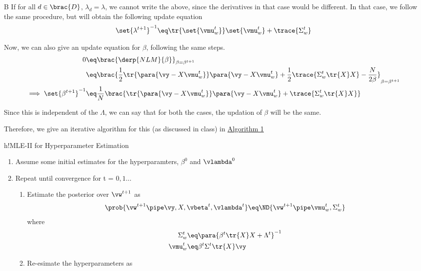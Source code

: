 \documentclass{article}
\begin{document}
\begin{question}
\begin{qpart}{B}
		If for all $d \in \brac{D}$, $\lambda_d = \lambda$, we cannot write the above, since the derivatives in that case would be different.
		In that case, we follow the same procedure, but will obtain the following update equation
		\begin{align*}
			\set{\lambda^{t + 1}}^{-1}	\eq	\tr{\set{\vmu_w^t}} \set{\vmu_w^t} + \trace{\Sigma_w^t}
		\end{align*}

		Now, we can also give an update equation for $\beta$, following the same steps.
		\begin{align*}
			0	&\eq	\brac{\derp{NLM}{\beta}}_{\beta = \beta^{t + 1}} \\
			&\eq	\brac{\frac{1}{2} \tr{\para{\vy - X \vmu_w^t}} \para{\vy - X \vmu_w^t} + \frac{1}{2} \trace{\Sigma_w^t \tr{X} X} - \frac{N}{2 \beta}}_{\beta = \beta^{t + 1}} \\
			\implies \set{\beta^{t + 1}}^{-1}	&\eq	\frac{1}{N} \brac{\tr{\para{\vy - X \vmu_w^t}} \para{\vy - X \vmu_w^t} + \trace{\Sigma_w^t \tr{X} X}}
		\end{align*}

		Since this is independent of the $\Lambda$, we can say that for both the cases, the updation of $\beta$ will be the same.

		Therefore, we give an iterative algorithm for this (as discussed in class) in \hyperlink{algo:1}{Algorithm 1}

		\begin{algo}[0.9\textwidth]{h!}{MLE-II for Hyperparameter Estimation}

			\begin{enumerate}
				\item Assume some initial estimates for the hyperparamters, $\beta^0$ and $\vlambda^0$
				\item Repeat until convergence for t = $0, 1 \dots$
					\begin{enumerate}
						\item Estimate the posterior over $\vw^{t + 1}$ as
							\begin{align*}
								\prob{\vw^{t + 1} \pipe \vy, X, \vbeta^t, \vlambda^t}	\eq	\ND{\vw^{t + 1} \pipe \vmu_w^t, \Sigma_w^t}
							\end{align*}
							where
							\begin{align*}
								\Sigma_w^t	&\eq	\para{\beta^t \tr{X} X + \Lambda^t}^{-1} \\
								\vmu_w^t	&\eq	\beta^t \Sigma^t \tr{X} \vy
							\end{align*}
						\item Re-esimate the hyperparameters as


\end{enumerate}
\end{enumerate}
\end{algo}
\end{qpart}
\end{question}
\end{document}
